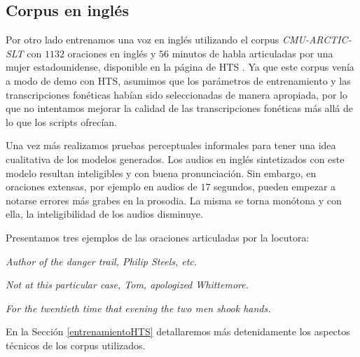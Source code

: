 
\subsection{Corpus en inglés}

Por otro lado entrenamos una voz en inglés utilizando el corpus \textit{CMU-ARCTIC-SLT} \cite{cmuArtic} con $1132$ oraciones en inglés y $56$ minutos de habla articuladas por una mujer estadounidense, disponible en la página de HTS \cite{hts}. Ya que este corpus venía a modo de demo con HTS, asumimos que los parámetros de entrenamiento y las transcripciones fonéticas habían sido seleccionadas de manera apropiada, por lo que no intentamos mejorar la calidad de las transcripciones fonéticas más allá de lo que los scripts ofrecían. 

Una vez más realizamos pruebas perceptuales informales para tener una idea cualitativa de los modelos generados. Los audios en inglés sintetizados con este modelo resultan inteligibles y con buena pronunciación. Sin embargo, en oraciones extensas, por ejemplo en audios de $17$ segundos, pueden empezar a notarse errores más grabes en la prosodia. La misma se torna monótona y con ella, la inteligibilidad de los audios disminuye.

Presentamos tres ejemplos de las oraciones articuladas por la locutora:

\indent\indent \textit{Author of the danger trail, Philip Steels, etc.}

\indent\indent \textit{Not at this particular case, Tom, apologized Whittemore.}

\indent\indent \textit{For the twentieth time that evening the two men shook hands.}

En la Sección \ref{entrenamientoHTS} detallaremos más detenidamente los aspectos técnicos de los corpus utilizados.

